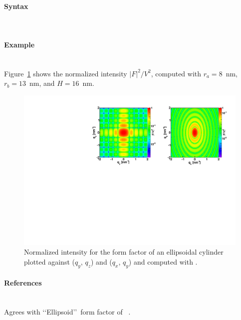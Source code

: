 \paragraph{Syntax}\strut\\

\newpage


\paragraph{Example}\strut\\
Figure~\ref{fig:FFellipscylinderEx} shows the normalized intensity
$|F|^2/V^2$, computed with $r_a=8$~nm, $r_b=13$~nm, and $H=16$~nm.
\begin{figure}[ht]
\begin{center}
\includegraphics[angle=-90,width=\textwidth]{fig/ff/figffellipscylinder.pdf}
\end{center}
\caption{Normalized intensity for the form factor of an ellipsoidal
  cylinder plotted against ($q_y$, $q_z$) and ($q_x$,
  $q_y$) and computed with .}
\label{fig:FFellipscylinderEx}
\end{figure}

\paragraph{References}\strut\\
Agrees with \lq\lq Ellipsoid\rq\rq\ form factor of \IsGISAXS~\cite{Laz02}.

\newpage
